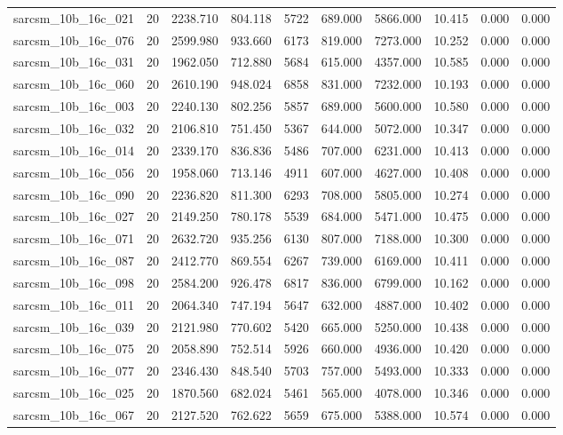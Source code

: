 \begin{tabular}{lrrrrrrrrr}
sarcsm\_10b\_16c\_021 & 20 & 2238.710 & 804.118 & 5722 & 689.000 & 5866.000 & 10.415 & 0.000 & 0.000 \\
sarcsm\_10b\_16c\_076 & 20 & 2599.980 & 933.660 & 6173 & 819.000 & 7273.000 & 10.252 & 0.000 & 0.000 \\
sarcsm\_10b\_16c\_031 & 20 & 1962.050 & 712.880 & 5684 & 615.000 & 4357.000 & 10.585 & 0.000 & 0.000 \\
sarcsm\_10b\_16c\_060 & 20 & 2610.190 & 948.024 & 6858 & 831.000 & 7232.000 & 10.193 & 0.000 & 0.000 \\
sarcsm\_10b\_16c\_003 & 20 & 2240.130 & 802.256 & 5857 & 689.000 & 5600.000 & 10.580 & 0.000 & 0.000 \\
sarcsm\_10b\_16c\_032 & 20 & 2106.810 & 751.450 & 5367 & 644.000 & 5072.000 & 10.347 & 0.000 & 0.000 \\
sarcsm\_10b\_16c\_014 & 20 & 2339.170 & 836.836 & 5486 & 707.000 & 6231.000 & 10.413 & 0.000 & 0.000 \\
sarcsm\_10b\_16c\_056 & 20 & 1958.060 & 713.146 & 4911 & 607.000 & 4627.000 & 10.408 & 0.000 & 0.000 \\
sarcsm\_10b\_16c\_090 & 20 & 2236.820 & 811.300 & 6293 & 708.000 & 5805.000 & 10.274 & 0.000 & 0.000 \\
sarcsm\_10b\_16c\_027 & 20 & 2149.250 & 780.178 & 5539 & 684.000 & 5471.000 & 10.475 & 0.000 & 0.000 \\
sarcsm\_10b\_16c\_071 & 20 & 2632.720 & 935.256 & 6130 & 807.000 & 7188.000 & 10.300 & 0.000 & 0.000 \\
sarcsm\_10b\_16c\_087 & 20 & 2412.770 & 869.554 & 6267 & 739.000 & 6169.000 & 10.411 & 0.000 & 0.000 \\
sarcsm\_10b\_16c\_098 & 20 & 2584.200 & 926.478 & 6817 & 836.000 & 6799.000 & 10.162 & 0.000 & 0.000 \\
sarcsm\_10b\_16c\_011 & 20 & 2064.340 & 747.194 & 5647 & 632.000 & 4887.000 & 10.402 & 0.000 & 0.000 \\
sarcsm\_10b\_16c\_039 & 20 & 2121.980 & 770.602 & 5420 & 665.000 & 5250.000 & 10.438 & 0.000 & 0.000 \\
sarcsm\_10b\_16c\_075 & 20 & 2058.890 & 752.514 & 5926 & 660.000 & 4936.000 & 10.420 & 0.000 & 0.000 \\
sarcsm\_10b\_16c\_077 & 20 & 2346.430 & 848.540 & 5703 & 757.000 & 5493.000 & 10.333 & 0.000 & 0.000 \\
sarcsm\_10b\_16c\_025 & 20 & 1870.560 & 682.024 & 5461 & 565.000 & 4078.000 & 10.346 & 0.000 & 0.000 \\
sarcsm\_10b\_16c\_067 & 20 & 2127.520 & 762.622 & 5659 & 675.000 & 5388.000 & 10.574 & 0.000 & 0.000 \\

\end{tabular}
